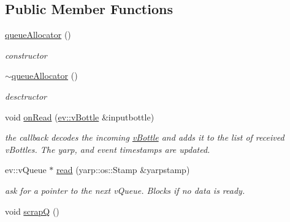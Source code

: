 \subsection*{Public Member Functions}
\begin{DoxyCompactItemize}
\item 
\hyperlink{classev_1_1queueAllocator_aecc5317205f3d9d5d753dfefcb2d3228}{queue\+Allocator} ()\hypertarget{classev_1_1queueAllocator_aecc5317205f3d9d5d753dfefcb2d3228}{}\label{classev_1_1queueAllocator_aecc5317205f3d9d5d753dfefcb2d3228}

\begin{DoxyCompactList}\small\item\em constructor \end{DoxyCompactList}\item 
\hyperlink{classev_1_1queueAllocator_a30954e25aa82ffd21aa513987a36bb40}{$\sim$queue\+Allocator} ()\hypertarget{classev_1_1queueAllocator_a30954e25aa82ffd21aa513987a36bb40}{}\label{classev_1_1queueAllocator_a30954e25aa82ffd21aa513987a36bb40}

\begin{DoxyCompactList}\small\item\em desctructor \end{DoxyCompactList}\item 
void \hyperlink{classev_1_1queueAllocator_a12ae388a8d2deb71ca5b927c3eb0a860}{on\+Read} (\hyperlink{classev_1_1vBottle}{ev\+::v\+Bottle} \&inputbottle)\hypertarget{classev_1_1queueAllocator_a12ae388a8d2deb71ca5b927c3eb0a860}{}\label{classev_1_1queueAllocator_a12ae388a8d2deb71ca5b927c3eb0a860}

\begin{DoxyCompactList}\small\item\em the callback decodes the incoming \hyperlink{classev_1_1vBottle}{v\+Bottle} and adds it to the list of received v\+Bottles. The yarp, and event timestamps are updated. \end{DoxyCompactList}\item 
ev\+::v\+Queue $\ast$ \hyperlink{classev_1_1queueAllocator_aa7d2e90c0cb859b798da083eb01b486a}{read} (yarp\+::os\+::\+Stamp \&yarpstamp)\hypertarget{classev_1_1queueAllocator_aa7d2e90c0cb859b798da083eb01b486a}{}\label{classev_1_1queueAllocator_aa7d2e90c0cb859b798da083eb01b486a}

\begin{DoxyCompactList}\small\item\em ask for a pointer to the next v\+Queue. Blocks if no data is ready. \end{DoxyCompactList}\item 
void \hyperlink{classev_1_1queueAllocator_a1a914bc39f534dc50a7eb2ba846753bf}{scrapQ} ()\hypertarget{classev_1_1queueAllocator_a1a914bc39f534dc50a7eb2ba846753bf}{}\label{classev_1_1queueAllocator_a1a914bc39f534dc50a7eb2ba846753bf}


\end{DoxyCompactItemize}
